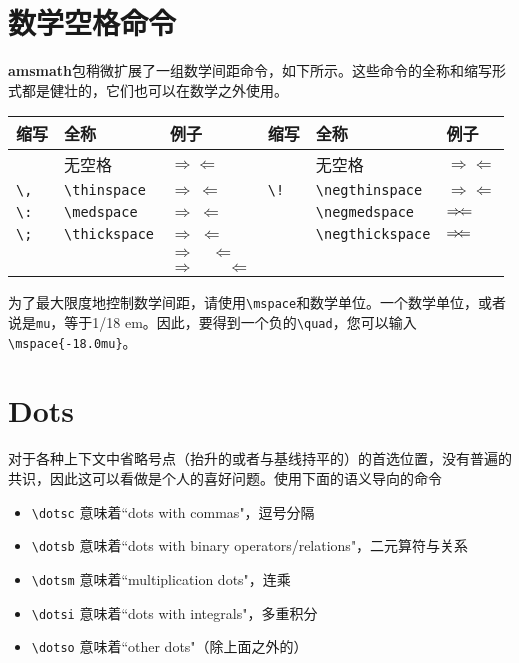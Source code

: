 \documentclass[openany]{ctexbook}
\begin{document}
\section{数学空格命令}
{\bfseries amsmath}包稍微扩展了一组数学间距命令，如下所示。这些命令的全称和缩写形式都是健壮的，它们也可以在数学之外使用。
\begin{center}
\begin{tabular}{p{}p{}p{}|p{}
p{}p{}}
缩写                &全称                 &例子             &缩写              &全称               &例子\\
\hline
          &无空格              &$\Rightarrow\Leftarrow$ &  &无空格&$\Rightarrow\Leftarrow$ \\
\verb|\,| &\verb|\thinspace|&$\Rightarrow\,\Leftarrow$ &\verb|\!|&\verb|\negthinspace|&$\Rightarrow\!\Leftarrow$\\
\verb|\:|&\verb|\medspace|&$\Rightarrow\:\Leftarrow$&  &\verb|\negmedspace|&$\Rightarrow\negmedspace\Leftarrow$\\
\verb|\;|&\verb|\thickspace|&$\Rightarrow\;\Leftarrow$&  &\verb|\negthickspace|&$\Rightarrow\negthickspace\Leftarrow$\\
&\quad&$\Rightarrow\quad\Leftarrow$&&&\\
&\qquad&$\Rightarrow\qquad\Leftarrow$&&&
\end{tabular}
\end{center}

为了最大限度地控制数学间距，请使用\verb|\mspace|和数学单位。一个数学单位，或者说是\verb|mu|，等于1/18 em。因此，要得到一个负的\verb|\quad|，您可以输入\verb|\mspace{-18.0mu}|。
\section{Dots}
对于各种上下文中省略号点（抬升的或者与基线持平的）的首选位置，没有普遍的共识，因此这可以看做是个人的喜好问题。使用下面的语义导向的命令
\begin{itemize}
  \item \verb|\dotsc| 意味着``dots with commas"，逗号分隔
  \item \verb|\dotsb| 意味着``dots with binary operators/relations"，二元算符与关系
  \item \verb|\dotsm| 意味着``multiplication dots"，连乘
  \item \verb|\dotsi| 意味着``dots with integrals"，多重积分
  \item \verb|\dotso| 意味着``other dots"（除上面之外的）
\end{itemize}
\end{document}
